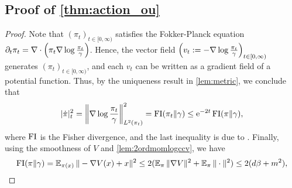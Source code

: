 \subsection{Proof of \cref{thm:action_ou}}
\label{app:prf:action_ou}
\begin{proof}
Note that $(\pi_t)_{t\in[0,\infty)}$ satisfies the Fokker-Planck equation $\partial_t\pi_t=\nabla\cdot\left(\pi_t\nabla\log\frac{\pi_t}{\gamma}\right)$. Hence, the vector field $\left(v_t:=-\nabla\log\frac{\pi_t}{\gamma}\right)_{t\in[0,\infty)}$ generates $(\pi_t)_{t\in[0,\infty)}$, and each $v_t$ can be written as a gradient field of a potential function. Thus, by the uniqueness result in \cref{lem:metric}, we conclude that 
$$|\dot\pi|^2_t=\left\|\nabla\log\frac{\pi_t}{\gamma}\right\|^2_{L^2(\pi_t)}=\operatorname{FI}(\pi_t\|\gamma)\le\mathrm{e}^{-2t}\operatorname{FI}(\pi\|\gamma),$$
where $\operatorname{FI}$ is the Fisher divergence, and the last inequality is due to \citet[Eq. 9.34]{villani2021topics}. Finally, using the smoothness of $V$ and \cref{lem:2ordmomlogccv}, we have
$$\operatorname{FI}(\pi\|\gamma)=\operatorname{\mathbb{E}}_{\pi(x)}\|-\nabla V(x)+x\|^2\le2(\operatorname{\mathbb{E}}_{\pi}\|\nabla V\|^2+\operatorname{\mathbb{E}}_\pi\|\cdot\|^2)\le2(d\beta+m^2),$$
\end{proof}